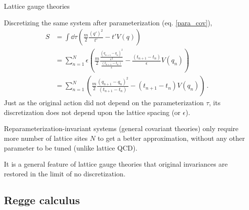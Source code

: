 \documentclass[12pt,titlepage]{article}
\begin{document}
\begin{frame}{Lattice gauge theories}
    \begin{list}{\,}{\leftmargin=1em \itemindent=0em}
        \item<1-> Discretizing the same system after parameterization (eq. \ref{para_cov}),
        \begin{align}
            S&=\int\dd{\tau}\left(\frac{m}{2}\frac{(q')^2}{t'}-t'V(q)\right)\\
            &=\sum_{n=1}^N\epsilon\left(\frac{m}{2}\frac{\frac{(q_{n+1}-q_n)^2}{\epsilon^2}}{\frac{(t_{n+1}-t_n)}{\epsilon}}-\frac{(t_{n+1}-t_n)}{\epsilon}V(q_n)\right)\\
            &=\sum_{n=1}^N\left(\frac{m}{2}\frac{(q_{n+1}-q_n)^2}{(t_{n+1}-t_n)}-(t_{n+1}-t_n)V(q_n)\right)\,.
        \end{align}
        Just as the original action did not depend on the parameterization $\tau$, its discretization does not depend upon the lattice spacing (or $\epsilon$).
        \item<2-> Reparameterization-invariant systems (general covariant theories) only require more number of lattice sites $N$ to get a better approximation, without any other parameter to be tuned (unlike lattice QCD).
        \item<3-> It is a general feature of lattice gauge theories that original invariances are restored in the limit of no discretization.
    \end{list}
\end{frame}

\subsection{Regge calculus}
\end{document}
